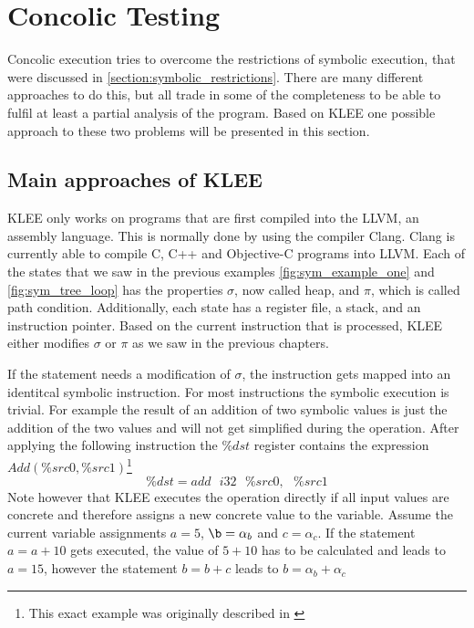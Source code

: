 \section{Concolic Testing} \label{section:concolic_testing}
Concolic execution tries to overcome the restrictions of symbolic execution, that were discussed in \ref{section:symbolic_restrictions}. There are many different approaches to do this, but all trade in some of the completeness to be able to fulfil at least a partial analysis of the program.
Based on KLEE \cite{Cadar:2008:KUA:1855741.1855756} one possible approach to these two problems will be presented in this section.

\subsection{Main approaches of KLEE}
KLEE only works on programs that are first compiled into the LLVM, an assembly language. This is normally done by using the compiler Clang. Clang is currently able to compile C, C++  and Objective-C programs into LLVM.
Each of the states that we saw in the previous examples \ref{fig:sym_example_one} and \ref{fig:sym_tree_loop} has the properties $\sigma$, now called heap, and $\pi$, which is called path condition. Additionally, each state has a register file, a stack, and an instruction pointer. Based on the current instruction that is processed, KLEE either modifies $\sigma$ or $\pi$ as we saw in the previous chapters.

If the statement needs a modification of $\sigma$, the instruction gets mapped into an identitcal symbolic instruction. For most instructions the symbolic execution is trivial. For example the result of an addition of two symbolic values is just the addition of the two values and will not get simplified during the operation. After applying the following instruction the $\%dst$ register contains the expression $Add(\%src0, \%src1)$\footnote{This exact example was originally described in \cite{Cadar:2008:KUA:1855741.1855756}}
$$\%dst = add\text{ }i32\text{ }\%src0,\text{ }\%src1$$
Note however that KLEE executes the operation directly if all input values are concrete and therefore assigns a new concrete value to the variable.
Assume the current variable assignments $a = 5$, $\b = \alpha_b$ and $c=\alpha_c$. If the statement $a = a + 10$ gets executed, the value of $5 + 10$ has to be calculated and leads to $a = 15$, however the statement $b = b + c$ leads to $b = \alpha_b + \alpha_c$

